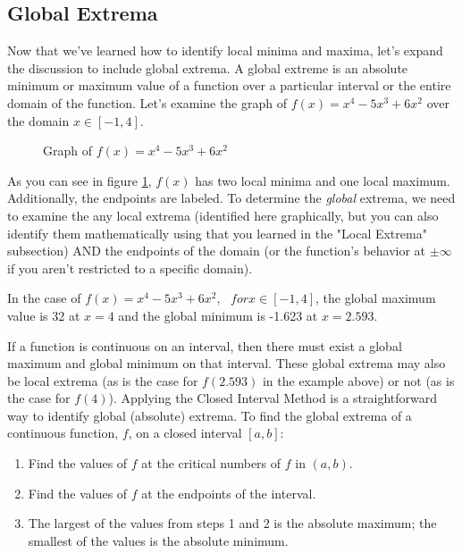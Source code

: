 \subsection{Global Extrema}
Now that we've learned how to identify local minima and maxima, let's expand the discussion to include global extrema. A global extreme is an absolute minimum or maximum value of a function over a particular interval or the entire domain of the function. Let's examine the graph of $f(x) = x^4-5x^3+6x^2$ over the domain $x \in [-1,4]$.

\begin{figure}[htbp]
  \centering
  \caption{Graph of \( f(x) = x^4-5x^3+6x^2 \) }
  \label{fig:globalext}
\end{figure}

As you can see in figure \ref{fig:globalext}, $f(x)$ has two local minima and one local maximum. Additionally, the endpoints are labeled. To determine the \textit{global} extrema, we need to examine the any local extrema (identified here graphically, but you can also identify them mathematically using that you learned in the "Local Extrema" subsection) AND the endpoints of the domain (or the function's behavior at $\pm \infty$ if you aren't restricted to a specific domain). 

In the case of $f(x) = x^4-5x^3+6x^2,\text{ }for x\in [-1,4]$, the global maximum value is 32 at $x=4$ and the global minimum is -1.623 at $x=2.593$. 

If a function is continuous on an interval, then there must exist a global maximum and global minimum on that interval. These global extrema may also be local extrema (as is the case for $f(2.593)$ in the example above) or not (as is the case for $f(4)$). Applying the Closed Interval Method is a straightforward way to identify global (absolute) extrema. To find the global extrema of a continuous function, $f$, on a closed interval $[a, b]$:
\begin{enumerate}
	\item Find the values of $f$ at the critical numbers of $f$ in $(a, b)$.
	\item Find the values of $f$ at the endpoints of the interval.
	\item The largest of the values from steps 1 and 2 is the absolute maximum; the smallest of the values is the absolute minimum.
\end{enumerate}

